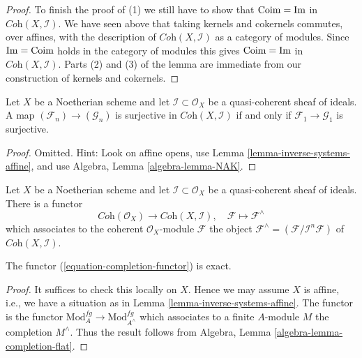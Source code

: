 \begin{proof}
\medskip\noindent
To finish the proof of (1) we still have to show that $\mathop{\mathrm{Coim}} = \mathop{\mathrm{Im}}$
in $\textit{Coh}(X, \mathcal{I})$. We have seen above that taking
kernels and cokernels commutes, over affines, with the description
of $\textit{Coh}(X, \mathcal{I})$ as a category of modules. Since
$\mathop{\mathrm{Im}} = \mathop{\mathrm{Coim}}$ holds in the category of modules
this gives $\mathop{\mathrm{Coim}} = \mathop{\mathrm{Im}}$ in $\textit{Coh}(X, \mathcal{I})$.
Parts (2) and (3) of the lemma are immediate from our construction
of kernels and cokernels.
\end{proof}

\begin{lemma}
\label{lemma-inverse-systems-surjective}
Let $X$ be a Noetherian scheme and let $\mathcal{I} \subset \mathcal{O}_X$
be a quasi-coherent sheaf of ideals. A map
$(\mathcal{F}_n) \to (\mathcal{G}_n)$ is surjective in
$\textit{Coh}(X, \mathcal{I})$
if and only if $\mathcal{F}_1 \to \mathcal{G}_1$ is surjective.
\end{lemma}

\begin{proof}
Omitted. Hint: Look on affine opens, use
Lemma \ref{lemma-inverse-systems-affine}, and use
Algebra, Lemma \ref{algebra-lemma-NAK}.
\end{proof}

\noindent
Let $X$ be a Noetherian scheme and let $\mathcal{I} \subset \mathcal{O}_X$
be a quasi-coherent sheaf of ideals. There is a functor
\begin{equation}
\label{equation-completion-functor}
\textit{Coh}(\mathcal{O}_X) \longrightarrow \textit{Coh}(X, \mathcal{I}), \quad
\mathcal{F} \longmapsto \mathcal{F}^\wedge
\end{equation}
which associates to the coherent $\mathcal{O}_X$-module $\mathcal{F}$
the object $\mathcal{F}^\wedge = (\mathcal{F}/\mathcal{I}^n\mathcal{F})$
of $\textit{Coh}(X, \mathcal{I})$.

\begin{lemma}
\label{lemma-exact}
The functor (\ref{equation-completion-functor}) is exact.
\end{lemma}

\begin{proof}
It suffices to check this locally on $X$. Hence we may assume $X$ is
affine, i.e., we have a situation as in
Lemma \ref{lemma-inverse-systems-affine}.
The functor is the functor $\text{Mod}^{fg}_A \to \text{Mod}^{fg}_{A^\wedge}$
which associates to a finite $A$-module $M$ the completion $M^\wedge$.
Thus the result follows from
Algebra, Lemma \ref{algebra-lemma-completion-flat}.
\end{proof}


